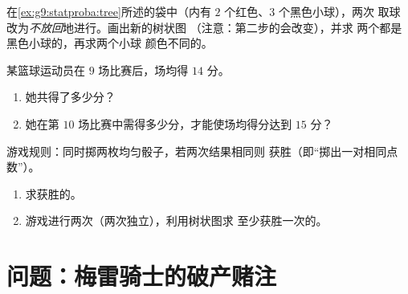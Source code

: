 \begin{exercise}[$\star\star$]\label{exo:g9:statproba:7}
在\cref{ex:g9:statproba:tree}所述的袋中（内有 $2$ 个红色、$3$ 个黑色小球），两次
取球改为\emph{不放回}地进行。画出新的树状图
（注意：第二步的会改变），并求
两个都是黑色小球的，再求两个小球
颜色不同的。
\end{exercise}

\begin{exercise}[$\star\star$]\label{exo:g9:statproba:8}
某篮球运动员在 $9$ 场比赛后，场均得 $14$ 分。
\begin{enumerate}
  \item 她共得了多少分？
  \item 她在第 $10$ 场比赛中需得多少分，才能使场均得分达到
        $15$ 分？
\end{enumerate}
\end{exercise}

\begin{exercise}[$\star\star\star$]\label{exo:g9:statproba:9}
游戏规则：同时掷两枚均匀骰子，若两次结果相同则
获胜（即“掷出一对相同点数”）。
\begin{enumerate}
  \item 求获胜的。
  \item 游戏进行两次（两次独立），利用树状图求
        至少获胜一次的。
\end{enumerate}
\end{exercise}

\section{问题：梅雷骑士的破产赌注}

